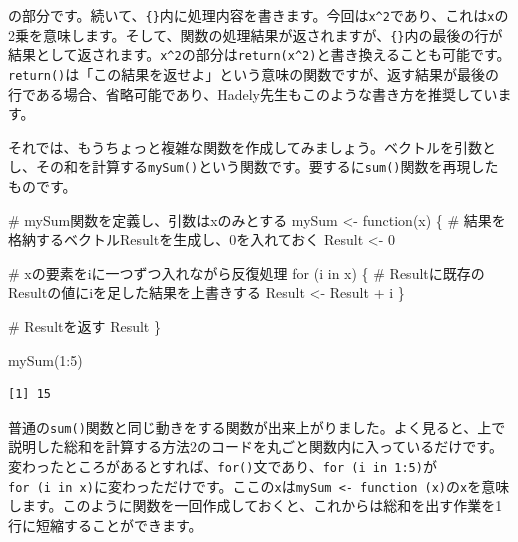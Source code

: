 \documentclass[
  a4paper,
  pandoc,
  ja=standard,
  jafont=haranoaji]{bxjsbook}
\newenvironment{Shaded}{\begin{snugshade}}{\end{snugshade}}
\newcommand{\CommentTok}[1]{\textcolor[rgb]{0.37,0.37,0.37}{#1}}
\newcommand{\ControlFlowTok}[1]{\textcolor[rgb]{0.00,0.48,0.65}{#1}}
\newcommand{\DecValTok}[1]{\textcolor[rgb]{0.68,0.00,0.00}{#1}}
\newcommand{\FunctionTok}[1]{\textcolor[rgb]{0.28,0.35,0.67}{#1}}
\newcommand{\NormalTok}[1]{\textcolor[rgb]{0.00,0.48,0.65}{#1}}
\newcommand{\OtherTok}[1]{\textcolor[rgb]{0.00,0.48,0.65}{#1}}
\newcommand{\SpecialCharTok}[1]{\textcolor[rgb]{0.37,0.37,0.37}{#1}}
\begin{document}
の部分です。続いて、\texttt{\{\}}内に処理内容を書きます。今回は\texttt{x\^{}2}であり、これは\texttt{x}の2乗を意味します。そして、関数の処理結果が返されますが、\texttt{\{\}}内の最後の行が結果として返されます。\texttt{x\^{}2}の部分は\texttt{return(x\^{}2)}と書き換えることも可能です。\texttt{return()}は「この結果を返せよ」という意味の関数ですが、返す結果が最後の行である場合、省略可能であり、Hadely先生もこのような書き方を推奨しています。

それでは、もうちょっと複雑な関数を作成してみましょう。ベクトルを引数とし、その和を計算する\texttt{mySum()}という関数です。要するに\texttt{sum()}関数を再現したものです。

\begin{Shaded}
\begin{Highlighting}[numbers=left,,]
\CommentTok{\# mySum関数を定義し、引数はxのみとする}
\NormalTok{mySum }\OtherTok{\textless{}{-}} \ControlFlowTok{function}\NormalTok{(x) \{}
  \CommentTok{\# 結果を格納するベクトルResultを生成し、0を入れておく}
\NormalTok{  Result }\OtherTok{\textless{}{-}} \DecValTok{0}
  
  \CommentTok{\# xの要素をiに一つずつ入れながら反復処理}
  \ControlFlowTok{for}\NormalTok{ (i }\ControlFlowTok{in}\NormalTok{ x) \{}
    \CommentTok{\# Resultに既存のResultの値にiを足した結果を上書きする}
\NormalTok{    Result }\OtherTok{\textless{}{-}}\NormalTok{ Result }\SpecialCharTok{+}\NormalTok{ i}
\NormalTok{  \}}
  
  \CommentTok{\# Resultを返す}
\NormalTok{  Result}
\NormalTok{\}}
\end{Highlighting}
\end{Shaded}

\begin{Shaded}
\begin{Highlighting}[numbers=left,,]
\FunctionTok{mySum}\NormalTok{(}\DecValTok{1}\SpecialCharTok{:}\DecValTok{5}\NormalTok{)}
\end{Highlighting}
\end{Shaded}

\begin{verbatim}
[1] 15
\end{verbatim}

普通の\texttt{sum()}関数と同じ動きをする関数が出来上がりました。よく見ると、上で説明した総和を計算する方法2のコードを丸ごと関数内に入っているだけです。変わったところがあるとすれば、\texttt{for()}文であり、\texttt{for\ (i\ in\ 1:5)}が\texttt{for\ (i\ in\ x)}に変わっただけです。ここの\texttt{x}は\texttt{mySum\ \textless{}-\ function\ (x)}の\texttt{x}を意味します。このように関数を一回作成しておくと、これからは総和を出す作業を1行に短縮することができます。
\end{document}

